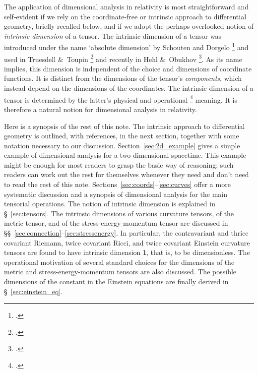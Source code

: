 \documentclass[\ifafour a4paper,12pt,\else a5paper,10pt,\fi%
onecolumn,oneside,article,%
british%
]{memoir}
\newcommand*{\defquote}[1]{`#1'}
\theoremstyle{remark}
\theoremstyle{innote}
\newcommand*{\citep}{\footcites}
\newcommand*{\amp}{\&}
\renewcommand*{\|}[1][]{\nonscript\,#1\vert\nonscript\;\mathopen{}}
\newcommand*{\sect}{\S}%
\newcommand*{\sects}{\S\S}%
\newcommand*{\chap}{ch.}%
\newcommand*{\Un}{\textsf{1}}
\begin{document}
The application of dimensional analysis in relativity is most
straightforward and self-evident if we rely on the coordinate-free or
intrinsic approach to differential geometry, briefly recalled below, and if
we adopt the perhaps overlooked notion of \emph{intrinsic dimension} of a
tensor. %
The intrinsic dimension of a tensor was
introduced under the name \defquote{absolute dimension} by Schouten and
Dorgelo \citep{dorgeloetal1946}[\chap~VI]{schouten1951_r1989} and used in
Truesdell \amp\ Toupin \citep[Appendix II]{truesdelletal1960} and recently
in Hehl \amp\ Obukhov \citep[\sect~B.1]{hehletal2003}{hehletal2004b}. As
its name implies, this dimension is independent of the choice and
dimensions of coordinate functions. It is distinct from the dimensions of
the tensor's \emph{components}, which instead depend on the dimensions of
the coordinates. The intrinsic dimension of a tensor is determined by the
latter's physical and operational \citep{bridgman1927_r1958} meaning. It is
therefore a natural notion for dimensional analysis in relativity.

\medskip

Here is a synopsis of the rest of this note. The intrinsic approach to
differential geometry is outlined, with references, in the next section,
together with some notation necessary to our discussion.
Section~\ref{sec:2d_example} gives a simple example of dimensional analysis
for a two-dimensional spacetime. This example might be enough for most
readers to grasp the basic way of reasoning; such readers can work out the
rest for themselves whenever they need and don't need to read the rest of
this note. Sections~\ref{sec:coords}--\ref{sec:curves} offer a more
systematic discussion and a synopsis of dimensional analysis for the main
tensorial operations. The notion of intrinsic dimension is explained in
\sect~\ref{sec:tensors}. The intrinsic dimensions of various curvature
tensors, of the metric tensor, and of the stress-energy-momentum tensor are
discussed in \sects~\ref{sec:connection}--\ref{sec:stressenergy}. In
particular, the contravariant and thrice covariant Riemann, twice covariant
Ricci, and twice covariant Einstein curvature tensors are found to have
intrinsic dimension $\Un$, that is, to be dimensionless. The operational
motivation of several standard choices for the dimensions of the metric and
stress-energy-momentum tensors are also discussed. The possible dimensions
of the constant in the Einstein equations are finally derived in
\sect~\ref{sec:einstein_eq}.
\end{document}
